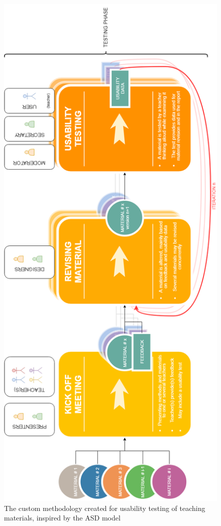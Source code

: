 \begin{figure}
\centering
\includegraphics[scale=0.6,angle=-90]{figure/workflow.png}
\vspace*{2cm}
\caption{The custom methodology created for usability testing of teaching materials, inspired by the ASD model}
\label{workflow}
\end{figure}

